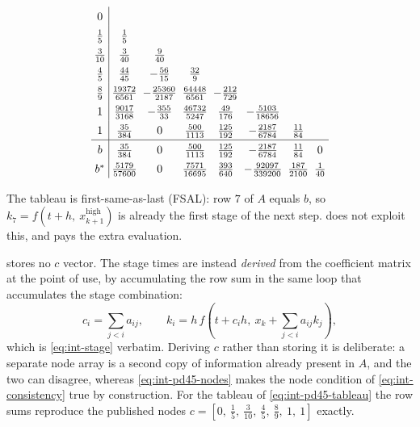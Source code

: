 \begin{equation}
  \label{eq:int-pd45-tableau}
  {\setlength{\arraycolsep}{2.5pt}
  \renewcommand{\arraystretch}{1.4}
  \begin{array}{c|ccccccc}
    0 & & & & & & & \\
    \tfrac{1}{5}   & \tfrac{1}{5} & & & & & & \\
    \tfrac{3}{10}  & \tfrac{3}{40} & \tfrac{9}{40} & & & & & \\
    \tfrac{4}{5}   & \tfrac{44}{45} & -\tfrac{56}{15} & \tfrac{32}{9}
                   & & & & \\
    \tfrac{8}{9}   & \tfrac{19372}{6561} & -\tfrac{25360}{2187}
                   & \tfrac{64448}{6561} & -\tfrac{212}{729} & & & \\
    1              & \tfrac{9017}{3168} & -\tfrac{355}{33}
                   & \tfrac{46732}{5247} & \tfrac{49}{176}
                   & -\tfrac{5103}{18656} & & \\
    1              & \tfrac{35}{384} & 0 & \tfrac{500}{1113}
                   & \tfrac{125}{192} & -\tfrac{2187}{6784}
                   & \tfrac{11}{84} & \\
    \hline
    b     & \tfrac{35}{384} & 0 & \tfrac{500}{1113} & \tfrac{125}{192}
          & -\tfrac{2187}{6784} & \tfrac{11}{84} & 0 \\
    b^{*} & \tfrac{5179}{57600} & 0 & \tfrac{7571}{16695} & \tfrac{393}{640}
          & -\tfrac{92097}{339200} & \tfrac{187}{2100} & \tfrac{1}{40}
  \end{array}}
\end{equation}

The tableau is first-same-as-last (FSAL): row $7$ of $A$ equals $b$, so
$k_7 = f(t+h,\ x^{\mathrm{high}}_{k+1})$ is already the first stage of the
next step. \lupnt{} does not exploit this, and pays the extra evaluation.

 stores no $c$ vector. The stage times are instead \emph{derived}
from the coefficient matrix at the point of use, by accumulating the row sum
in the same loop that accumulates the stage combination:
\begin{equation}
  \label{eq:int-pd45-nodes}
  c_i = \sum_{j<i} a_{ij},
  \qquad
  k_i = h\, f\!\left(t + c_i h,\ x_k + \sum_{j<i} a_{ij} k_j\right),
\end{equation}
which is \cref{eq:int-stage} verbatim. Deriving $c$ rather than storing it is
deliberate: a separate node array is a second copy of information already
present in $A$, and the two can disagree, whereas
\cref{eq:int-pd45-nodes} makes the node condition of
\cref{eq:int-consistency} true by construction. For the tableau of
\cref{eq:int-pd45-tableau} the row sums reproduce the published nodes
$c = \left[0,\ \tfrac{1}{5},\ \tfrac{3}{10},\ \tfrac{4}{5},\ \tfrac{8}{9},
\ 1,\ 1\right]$ exactly.

